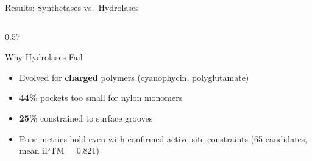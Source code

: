 \documentclass[aspectratio=169, 11pt]{beamer}
\begin{document}
\begin{frame}{Results: Synthetases vs.\ Hydrolases}
\begin{columns}[T]
\begin{column}{0.57\textwidth}
\begin{alertblock}{Why Hydrolases Fail}
\begin{itemize}\scriptsize
\item Evolved for \textbf{charged} polymers (cyanophycin, polyglutamate)
\item \textbf{44\%} pockets too small for nylon monomers
\item \textbf{25\%} constrained to surface grooves
\item Poor metrics hold even with confirmed active-site constraints (65 candidates, mean iPTM = 0.821)
\end{itemize}
\end{alertblock}
\end{column}
\end{columns}
\end{frame}
\end{document}
